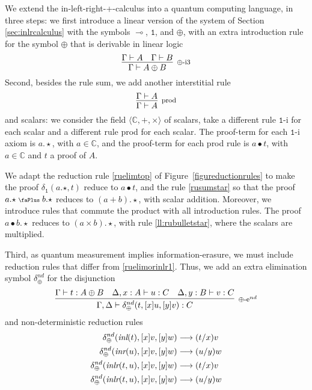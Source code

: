 \documentclass[screen, sigconf,authorversion,nonacm]{acmart}
\theoremstyle{acmdefinition}
\numberwithin{equation}{section}
\newcommand\irule[3]{\infer[\mbox{\footnotesize $#3$}]{#2}{#1}}
\newcommand\abstr[1]{[#1]}
\newcommand\inl{\mbox{\it inl}}
\newcommand\inr{\mbox{\it inr}}
\newcommand\inlr{\mbox{\it inlr}}
\newcommand\plus{\mathrel{\text{\normalfont\scalebox{0.7}{\faPlus}}}}
\newcommand\one{\ensuremath{\mathtt 1}}
\newcommand\elimone{\delta_{\one}}
\newcommand\elimplus{\delta_{\oplus}}
\begin{document}
We extend the in-left-right-+-calculus into a quantum computing
language, in three steps: we first introduce a linear version of the
system of Section \ref{sec:inlrcalculus} with the symbols $\multimap$,
$\one$, and $\oplus$, with an extra introduction rule for the symbol
$\oplus$ that is derivable in linear logic
$$\irule{\Gamma \vdash A & \Gamma \vdash B}
        {\Gamma \vdash A \oplus B}
        {\mbox{$\oplus$-i3}}$$
Second, besides the rule sum, we add another interstitial rule
$$\irule{\Gamma \vdash A}
        {\Gamma \vdash A}
        {\mbox{prod}}$$
and scalars: we consider the field $\langle {\mathbb C}, +,
\times\rangle$ of scalars, take a different rule $\one$-i for each
scalar and a different rule prod for each scalar.  The proof-term for
each $\one$-i axiom is $a.\star$, with $a\in {\mathbb C}$, and the
proof-term for each prod rule is $a\bullet t$, with $a\in {\mathbb C}$
and $t$ a proof of $A$.

We adapt the reduction rule \eqref{ruelimtop} of
Figure~\ref{figureductionrules} to make the proof $\elimone(a.\star,
t)$ reduce to $a \bullet t$, and the rule \eqref{rusumstar} so that
the proof $a.\star \plus b.\star$ reduces to $(a + b).\star$, with
scalar addition. Moreover, we introduce rules that commute the product
with all introduction rules. The proof $a \bullet b.\star$ reduces to
$(a \times b).\star$, with rule \eqref{ll:rubulletstar}, where the scalars are multiplied.

Third, as quantum measurement implies
information-erasure, we must include reduction rules that differ from
\eqref{ruelimorinlr1}.  Thus, we add an extra elimination symbol
$\elimplus^{nd}$ for the disjunction
$$\irule{\Gamma \vdash t:A \oplus B & \Delta, x:A \vdash u:C & \Delta,
         y:B \vdash v:C}
        {\Gamma, \Delta \vdash \elimplus^{nd}(t,\abstr{x}u,\abstr{y}v):C}
        {\mbox{$\oplus$-e$^{nd}$}}$$
and non-deterministic reduction rules
\begin{align*}
\elimplus^{nd}(\inl(t),\abstr{x}v,\abstr{y}w) & \longrightarrow (t/x)v
    \\
\elimplus^{nd}(\inr(u),\abstr{x}v,\abstr{y}w) & \longrightarrow (u/y)w
    \\
\elimplus^{nd}(\inlr(t,u),\abstr{x}v,\abstr{y}w) & \longrightarrow (t/x)v
    \\
\elimplus^{nd}(\inlr(t,u),\abstr{x}v,\abstr{y}w) & \longrightarrow (u/y)w 
\end{align*}
\end{document}
